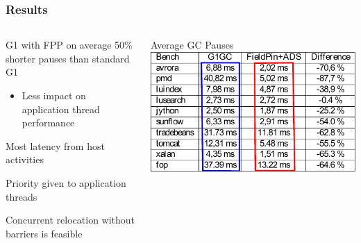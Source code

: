 \documentclass{beamer}
\newcommand{\linespace}{\vskip 0.25cm}
\begin{document}
\begin{frame}

\frametitle{Results}


\begin{columns}
\begin{column}{0.5\textwidth}

\color{red}G1 with FPP \color{black}on average 50\% shorter pauses than \color{blue}standard G1\color{black}
\begin{itemize}
\item Less impact on application thread performance
\end{itemize}

\linespace

Most latency from host activities

\linespace

Priority given to application threads

\linespace

Concurrent relocation without barriers is feasible

\end{column}

\begin{column}{0.5\textwidth}
\begin{center}
Average GC Pauses
\includegraphics[width=.90\textwidth]{Illustrations/fpp_results_2.pdf}
\end{center}
\end{column}
\end{columns}

\end{frame}
\end{document}
